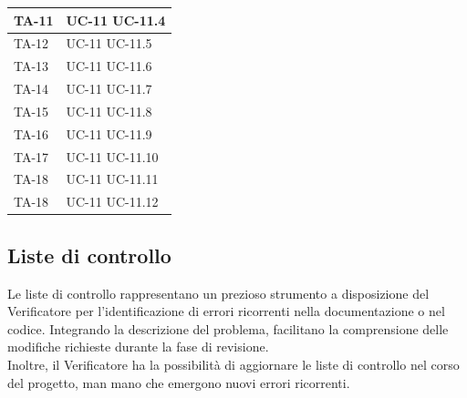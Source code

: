 \documentclass[8pt]{article}
\begin{document}
\begin{longtable}{|>{\centering}p{4cm}|>{\centering\arraybackslash}p{4cm}|}
    \hline
    TA-11 & UC-11 \newline
            UC-11.4
    \\
    \hline
    TA-12 & UC-11 \newline
            UC-11.5
    \\
    \hline
    TA-13 & UC-11 \newline
            UC-11.6
    \\
    \hline
    TA-14 & UC-11 \newline
            UC-11.7
    \\
    \hline
    TA-15 & UC-11 \newline
            UC-11.8
    \\
    \hline
    TA-16 & UC-11 \newline
            UC-11.9
    \\
    \hline
    TA-17 & UC-11 \newline
            UC-11.10
    \\
    \hline
    TA-18 & UC-11 \newline
            UC-11.11
    \\
    \hline
    TA-18 & UC-11 \newline
            UC-11.12
    \\
    \hline
\end{longtable}
\clearpage
\subsection{Liste di controllo}\label{sec:liste controllo}
Le liste di controllo rappresentano un prezioso strumento a disposizione del
Verificatore per l'identificazione di errori ricorrenti nella documentazione o nel codice. Integrando la descrizione del problema, facilitano la comprensione delle modifiche richieste durante la fase di revisione.
\\
Inoltre, il Verificatore ha la possibilità di aggiornare le liste di controllo nel corso del progetto, man mano che emergono nuovi errori ricorrenti.
\end{document}
